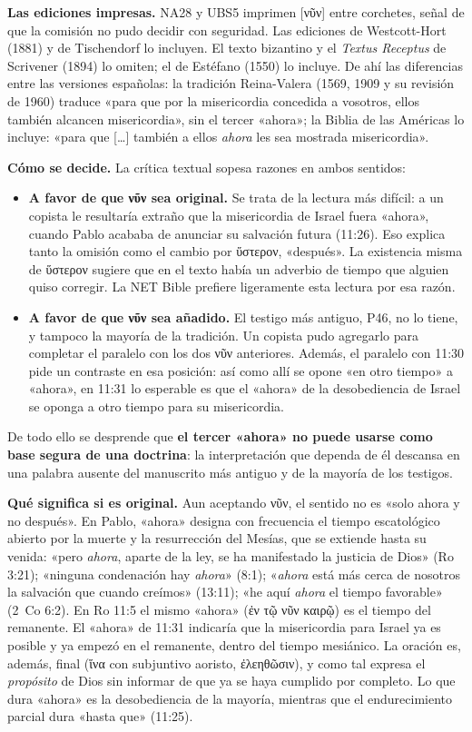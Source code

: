 \documentclass[11pt,letterpaper]{article}
\newcommand{\grc}[1]{\foreignlanguage{ancientgreek}{#1}}
\newcommand{\destacar}[1]{\textbf{\textcolor{ladrillo}{#1}}}
\begin{document}
\textbf{Las ediciones impresas.} NA28 y UBS5 imprimen \grc{[νῦν]} entre corchetes, señal de que la comisión no pudo decidir con seguridad. Las ediciones de Westcott-Hort (1881) y de Tischendorf lo incluyen. El texto bizantino y el \emph{Textus Receptus} de Scrivener (1894) lo omiten; el de Estéfano (1550) lo incluye. De ahí las diferencias entre las versiones españolas: la tradición Reina-Valera (1569, 1909 y su revisión de 1960) traduce «para que por la misericordia concedida a vosotros, ellos también alcancen misericordia», sin el tercer «ahora»; la Biblia de las Américas lo incluye: «para que [\ldots] también a ellos \emph{ahora} les sea mostrada misericordia».

\textbf{Cómo se decide.} La crítica textual sopesa razones en ambos sentidos:
\begin{itemize}
\item \textbf{A favor de que \grc{νῦν} sea original.} Se trata de la lectura más difícil: a un copista le resultaría extraño que la misericordia de Israel fuera «ahora», cuando Pablo acababa de anunciar su salvación futura (11:26). Eso explica tanto la omisión como el cambio por \grc{ὕστερον}, «después». La existencia misma de \grc{ὕστερον} sugiere que en el texto había un adverbio de tiempo que alguien quiso corregir. La NET Bible prefiere ligeramente esta lectura por esa razón.
\item \textbf{A favor de que \grc{νῦν} sea añadido.} El testigo más antiguo, P46, no lo tiene, y tampoco la mayoría de la tradición. Un copista pudo agregarlo para completar el paralelo con los dos \grc{νῦν} anteriores. Además, el paralelo con 11:30 pide un contraste en esa posición: así como allí se opone «en otro tiempo» a «ahora», en 11:31 lo esperable es que el «ahora» de la desobediencia de Israel se oponga a otro tiempo para su misericordia.
\end{itemize}
De todo ello se desprende que \destacar{el tercer «ahora» no puede usarse como base segura de una doctrina}: la interpretación que dependa de él descansa en una palabra ausente del manuscrito más antiguo y de la mayoría de los testigos.

\textbf{Qué significa si es original.} Aun aceptando \grc{νῦν}, el sentido no es «solo ahora y no después». En Pablo, «ahora» designa con frecuencia el tiempo escatológico abierto por la muerte y la resurrección del Mesías, que se extiende hasta su venida: «pero \emph{ahora}, aparte de la ley, se ha manifestado la justicia de Dios» (Ro 3:21); «ninguna condenación hay \emph{ahora}» (8:1); «\emph{ahora} está más cerca de nosotros la salvación que cuando creímos» (13:11); «he aquí \emph{ahora} el tiempo favorable» (2~Co 6:2). En Ro 11:5 el mismo «ahora» (\grc{ἐν τῷ νῦν καιρῷ}) es el tiempo del remanente. El «ahora» de 11:31 indicaría que la misericordia para Israel ya es posible y ya empezó en el remanente, dentro del tiempo mesiánico. La oración es, además, final (\grc{ἵνα} con subjuntivo aoristo, \grc{ἐλεηθῶσιν}), y como tal expresa el \emph{propósito} de Dios sin informar de que ya se haya cumplido por completo. Lo que dura «ahora» es la desobediencia de la mayoría, mientras que el endurecimiento parcial dura «hasta que» (11:25).
\end{document}
